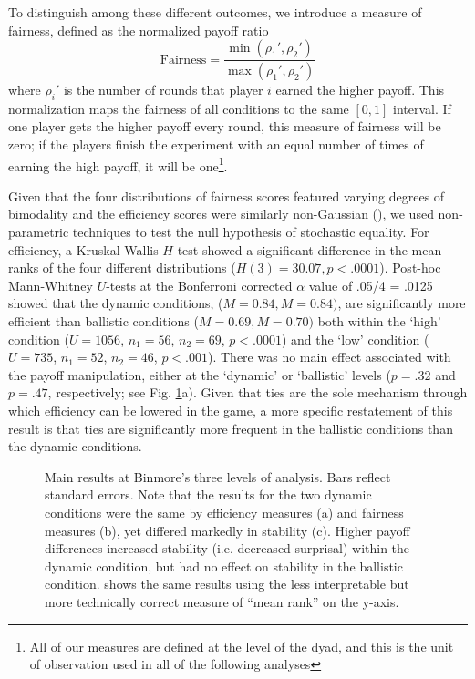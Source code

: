 \documentclass[10pt,letterpaper]{article}
\begin{document}
To distinguish among these different outcomes, we introduce a measure of fairness, defined as the normalized payoff ratio $$\text{Fairness} = \frac{\min(\rho_1', \rho_2')}{\max(\rho_1', \rho_2')}$$ where $\rho_i'$ is the number of rounds that player $i$ earned the higher payoff. This normalization maps the fairness of all conditions to the same $[0,1]$ interval. If one player gets the higher payoff every round, this measure of fairness will be zero; if the players finish the experiment with an equal number of times of earning the high payoff, it will be one\footnote{All of our measures are defined at the level of the dyad, and this is the unit of observation used in all of the following analyses}. 

Given that the four distributions of fairness scores featured varying degrees of bimodality and the efficiency scores were similarly non-Gaussian (), we used non-parametric techniques to test the null hypothesis of stochastic equality. For efficiency, a Kruskal-Wallis $H$-test showed a significant difference in the mean ranks of the four different distributions ($H(3) = 30.07, p < .0001$). Post-hoc Mann-Whitney $U$-tests at the Bonferroni corrected $\alpha$ value of .05/4 = .0125 showed that the dynamic conditions, ($M = 0.84, M = 0.84)$, are significantly more efficient than ballistic conditions ($M = 0.69, M = 0.70)$ both within the `high' condition ($U = 1056$, $n_1 = 56$, $n_2 = 69$, $p < .0001$) and the `low' condition ($U = 735$, $n_1 = 52$, $n_2 = 46$, $p < .001$). There was no main effect associated with the payoff manipulation, either at the `dynamic' or `ballistic' levels ($p = .32$ and $p = .47$, respectively; see Fig. \ref{Fig2}a). Given that ties are the sole mechanism through which efficiency can be lowered in the game, a more specific restatement of this result is that ties are significantly more frequent in the ballistic conditions than the dynamic conditions.

\begin{figure}[t]
\centering
\caption{Main results at Binmore's three levels of analysis. Bars reflect standard errors. Note that the results for the two dynamic conditions were the same by efficiency measures (a) and fairness measures (b), yet differed markedly in stability (c). Higher payoff differences increased stability (i.e. decreased surprisal) within the dynamic condition, but had no effect on stability in the ballistic condition.  shows the same results using the less interpretable but more technically correct measure of ``mean rank'' on the y-axis.}
\label{Fig2}
\end{figure}
\end{document}
